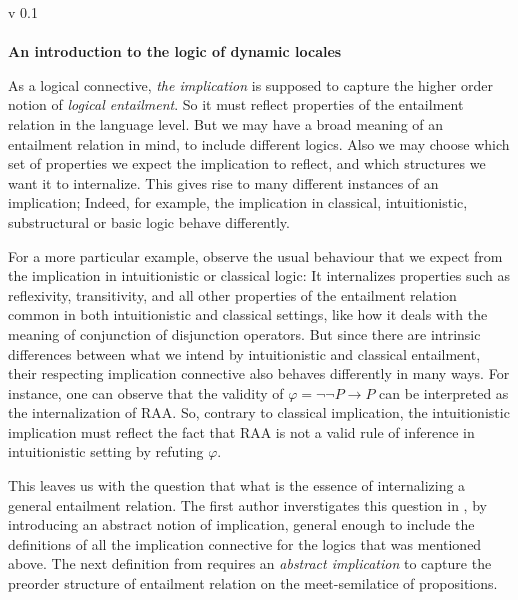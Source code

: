 \documentclass[a4paper, 12pt]{amsart}
\begin{document}
{\noindent
	v 0.1 \\
  \\
{\Huge\textbf{An introduction to the logic of dynamic locales}}
}\\
\vspace*{1cm}
\setcounter{section}{1}

As a logical connective, \emph{the implication} is supposed to capture the higher order notion of \emph{logical entailment}. So it must reflect properties of the entailment relation in the language level. But we may have a broad meaning of an entailment relation in mind, to include different logics. Also we may choose which set of properties we expect the implication to reflect, and which structures we want it to internalize. This gives rise to many different instances of an implication; Indeed, for example, the implication in classical, intuitionistic, substructural or basic logic behave differently.

For a more particular example, observe the usual behaviour that we expect from the implication in intuitionistic or classical logic: It internalizes properties such as reflexivity, transitivity, and all other properties of the entailment relation common in both intuitionistic and classical settings, like how it deals with the meaning of conjunction of disjunction operators. But since there are intrinsic differences between what we intend by intuitionistic and classical entailment, their respecting implication connective also behaves differently in many ways. For instance, one can observe that the validity of $\varphi = \neg \neg P \rightarrow P$ can be interpreted as the internalization of RAA. So, contrary to classical implication, the intuitionistic implication must reflect the fact that RAA is not a valid rule of inference in intuitionistic setting by refuting $\varphi$.

This leaves us with the question that what is the essence of internalizing a general entailment relation. The first author inverstigates this question in \cite{amir}, by introducing an abstract notion of implication, general enough to include the definitions of all the implication connective for the logics that was mentioned above. The next definition from \cite{amir} requires an \emph{abstract implication} to capture the preorder structure of entailment relation on the meet-semilatice of propositions.
\end{document}
